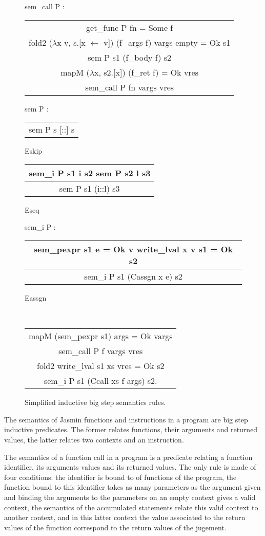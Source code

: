 \documentclass{article}
\begin{document}
\begin{figure}[t]
\ttfamily
sem\_call P :
\begin{center}
\begin{tabular}{c}
get\_func P fn = Some f \\
fold2 (\(\lambda\)x v, s.[x \(\leftarrow\) v]) (f\_args f) vargs empty = Ok s1 \\
sem P s1 (f\_body f) s2 \\
mapM (\(\lambda\)x, s2.[x]) (f\_ret f) = Ok vres
\\\hline
sem\_call P fn vargs vres
\end{tabular}
\end{center}

sem P :
\begin{center}
\begin{tabular}{c}
\\\hline
sem P s [::] s
\end{tabular} Eskip\quad
\begin{tabular}{c}
sem\_i P s1 i s2\quad
sem P s2 l s3
\\\hline
sem P s1 (i::l) s3
\end{tabular} Eseq
\end{center}

sem\_i P :
\begin{center}
\begin{tabular}{c}
sem\_pexpr s1 e = Ok v\quad
write\_lval x v s1 = Ok s2
\\\hline
sem\_i P s1 (Cassgn x e) s2
\end{tabular} Eassgn

~

\begin{tabular}{c}
mapM (sem\_pexpr s1) args = Ok vargs \\
sem\_call P f vargs vres \\
fold2 write\_lval s1 xs vres = Ok s2
\\\hline
sem\_i P s1 (Ccall xs f args) s2.
\end{tabular} \raisebox{-\baselineskip}{Ecall}
\end{center}
\normalfont%
\caption{Simplified inductive big step semantics rules.}
\end{figure}

The semantics of Jasmin functions and instructions in a program are big step
inductive predicates. The former relates functions, their arguments and returned
values, the latter relates two contexts and an instruction.

The semantics of a function call in a program is a predicate relating a function
identifier, its arguments values and its returned values. The only rule is made
of four conditions: the identifier is bound to of functions of the program, the
function bound to this identifier takes as many parameters as the argument given
and binding the arguments to the parameters on an empty context gives a valid
context, the semantics of the accumulated statements relate this valid context
to another context, and in this latter context the value associated to the
return values of the function correspond to the return values of the jugement.
\end{document}
